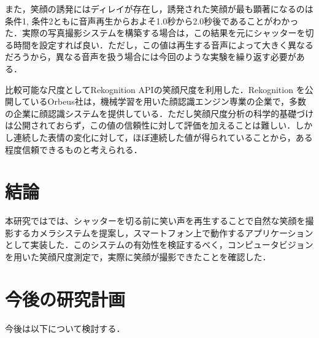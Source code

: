 \documentclass[report,10pt,uplatex,titlepage]{jsarticle}
\begin{document}
また，笑顔の誘発にはディレイが存在し，誘発された笑顔が最も顕著になるのは条件1, 条件2ともに音声再生からおよそ1.0秒から2.0秒後であることがわかった．実際の写真撮影システムを構築する場合は，この結果を元にシャッターを切る時間を設定すれば良い．ただし，この値は再生する音声によって大きく異なるだろうから，異なる音声を扱う場合には今回のような実験を繰り返す必要がある．

比較可能な尺度としてRekognition APIの笑顔尺度を利用した．Rekognition を公開しているOrbeus社は，機械学習を用いた顔認識エンジン専業の企業で，多数の企業に顔認識システムを提供している\cite{Orbeus}．ただし笑顔尺度分析の科学的基礎づけは公開されておらず，この値の信頼性に対して評価を加えることは難しい．しかし連続した表情の変化に対して，ほぼ連続した値が得られていることから，ある程度信頼できるものと考えられる．



\section{結論}

本研究ではでは、シャッターを切る前に笑い声を再生することで自然な笑顔を撮影するカメラシステムを提案し，スマートフォン上で動作するアプリケーションとして実装した．このシステムの有効性を検証するべく，コンピュータビジョンを用いた笑顔尺度測定で，実際に笑顔が撮影できたことを確認した．

\section{今後の研究計画}

今後は以下について検討する．
\end{document}
